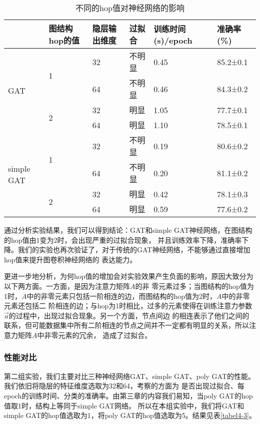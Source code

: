 \begin{table}[htbp]
    \centering
    \caption{不同的hop值对神经网络的影响}
    \label{tabel4-2}
    \begin{tabular}{|l|l|l|l|l|l|}
    \hline
                         & 图结构hop的值           & 隐层输出维度 & 过拟合 & 训练时间(s)/epoch & 准确率(\%)      \\ \hline
    \multirow{4}{*}{GAT} & \multirow{2}{*}{1} & 32     & 不明显 & 0.45            & 85.2±0.1 \\ \cline{3-6}
                         &                    & 64     & 不明显 & 0.46            & 84.3±0.2 \\ \cline{2-6}
                         & \multirow{2}{*}{2} & 32     & 明显   & 1.05            & 77.7±0.1 \\ \cline{3-6}
                         &                    & 64     & 明显   & 1.10            & 78.5±0.1 \\ \hline
    \multirow{4}{*}{simple GAT} & \multirow{2}{*}{1} & 32     & 不明显 & 0.19     & 80.6±0.2 \\ \cline{3-6}
                         &                    & 64     & 不明显 & 0.20            & 81.1±0.2 \\ \cline{2-6}
                         & \multirow{2}{*}{2} & 32     & 明显   & 0.42            & 78.1±0.3 \\ \cline{3-6}
                         &                    & 64     & 明显   & 0.59            & 77.6±0.2 \\ \hline                    
    \end{tabular}
\end{table}

通过分析实验结果，我们可以得到结论：GAT和simple GAT神经网络，在图结构的hop值由1变为2时，会出现严重的过拟合现象，
并且训练效率下降，准确率下降。我们的实验也再次验证了，对于传统的GAT神经网络，不能够通过直接增加hop值来提升图卷积神经网络的
表达能力。

更进一步地分析，为何hop值的增加会对实验效果产生负面的影响，原因大致分为以下两方面。一方面，是因为注意力矩阵$A$的非
零元素过多；当图结构的hop值为1时，$A$中的非零元素只包括一阶相连的边，而图结构的hop值为2时，$A$中的非零元素还包括二
阶相连的边；与hop为1时相比，过多的元素使得在训练注意力参数$ \vec{a} $的过程中，出现过拟合现象。另一个方面，节点间边
的相连表示了他们之间的联系，但可能数据集中所有二阶相连的节点之间并不一定都有明显的关系，所以注意力矩阵$A$中非零元素的冗余，
造成了过拟合。

\subsubsection{性能对比}
第二组实验，我们主要对比三种神经网络GAT、simple GAT、poly GAT的性能。我们依旧将隐层的特征维度选取为32和64，考察的方面为
是否出现过拟合、每epoch的训练时间、分类的准确率。由第三章的内容我们易知，当poly GAT的hop值取1时，结构上等同于simple GAT网络。
所以在本组实验中，我们将GAT和simple GAT的hop值选取为1，将poly GAT的hop值选取为5。结果见表\ref{tabel4-3}。

